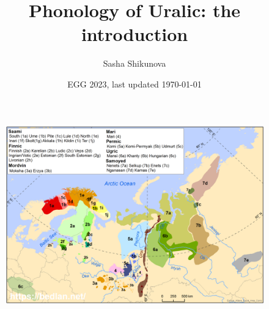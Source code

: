 \documentclass[10 pt, handout]{beamer}
\title{Phonology of Uralic: the introduction}
\author{Sasha Shikunova}
\institute{HSE University (Moscow)}
\date{EGG 2023, last updated \today}
\begin{document}
\begin{frame}
\titlepage
\end{frame}
		
\begin{frame}{}

	\begin{figure}[H]
		\centering
		\includegraphics[scale=.15]{uralic-map}
	\end{figure}

\end{frame}
\end{document}
